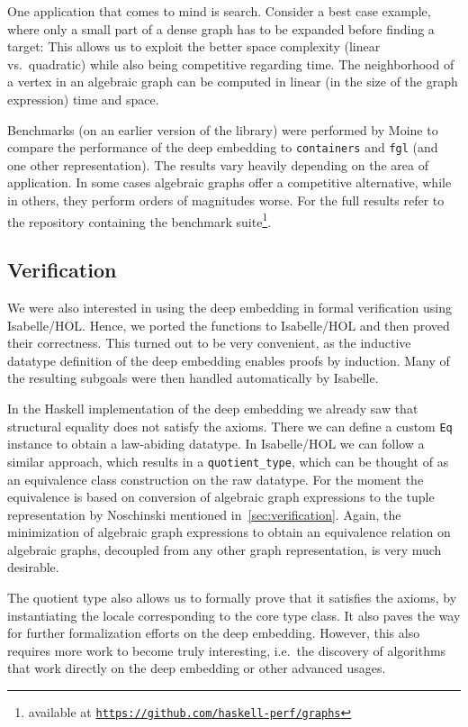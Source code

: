 \documentclass{article}
\newcommand{\hs}{\texttt}
\begin{document}
One application that comes to mind is search. Consider a best case example,
where only a small part of a dense graph has to be expanded before finding a target:
This allows us to exploit the better space complexity (linear vs.\ quadratic)
while also being competitive regarding time. The neighborhood of a vertex in an
algebraic graph can be computed in linear (in the size of the graph expression)
time and space.

Benchmarks (on an earlier version of the library) were performed by Moine to compare
the performance of the deep embedding to \texttt{containers} and \texttt{fgl}
(and one other representation). The results vary heavily depending on the area of
application. In some cases algebraic graphs offer a competitive alternative,
while in others, they perform orders of magnitudes worse. For the full results
refer to the repository containing the benchmark suite\footnote{available at
  \texttt{\href{https://github.com/haskell-perf/graphs}{https://github.com/haskell-perf/graphs}}}.

\subsection{Verification}\label{sec:quotient}
We were also interested in using the deep embedding in formal verification using
Isabelle/HOL. Hence, we ported the functions to Isabelle/HOL and then proved
their correctness. This
turned out to be very convenient, as the inductive datatype definition of the deep
embedding enables proofs by induction. Many of the resulting subgoals were then handled
automatically by Isabelle.

In the Haskell implementation of the deep embedding we already saw that
structural equality does not satisfy the axioms. There we can define a custom
\hs{Eq} instance to obtain a law-abiding datatype. In Isabelle/HOL we can follow
a similar approach, which results in a \texttt{quotient\_type}, which can be
thought of as an equivalence class construction on the raw datatype. For the
moment the equivalence is based on conversion of algebraic graph expressions to
the tuple representation by Noschinski mentioned in~\autoref{sec:verification}.
Again, the minimization of algebraic graph expressions to obtain an equivalence
relation on algebraic graphs, decoupled from any other graph representation, is
very much desirable.

The quotient type also allows us to formally prove that it satisfies the axioms,
by instantiating the locale corresponding to the core type class. It also paves
the way for further formalization efforts on the deep embedding. However, this
also requires more work to become truly interesting, i.e.\ the discovery of algorithms that
work directly on the deep embedding or other advanced usages.
\end{document}
